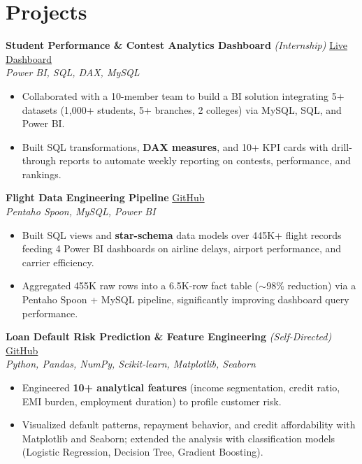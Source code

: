 \documentclass[a4paper,10pt]{article}
\begin{document}
\section{Projects}
\textbf{Student Performance \& Contest Analytics Dashboard} \textit{(Internship)} \hfill \href{https://app.powerbi.com/links/q7Z6OSaJ-t?ctid=0d11b6ec-52ac-4a84-9442-43048f433ac9&pbi_source=linkShare}{Live Dashboard} \\
\textit{Power BI, SQL, DAX, MySQL}
\begin{itemize}[nosep,after=\strut, leftmargin=1em, itemsep=1pt,label=--]
\item Collaborated with a 10-member team to build a BI solution integrating 5+ datasets (1,000+ students, 5+ branches, 2 colleges) via MySQL, SQL, and Power BI.
\item Built SQL transformations, \textbf{DAX measures}, and 10+ KPI cards with drill-through reports to automate weekly reporting on contests, performance, and rankings.
\end{itemize}
\vspace{2pt}
\textbf{Flight Data Engineering Pipeline} \hfill \href{https://github.com/Rider-04/flight-data-engineering-pipeline.git}{GitHub} \\
\textit{Pentaho Spoon, MySQL, Power BI}
\begin{itemize}[nosep,after=\strut, leftmargin=1em, itemsep=1pt,label=--]
\item Built SQL views and \textbf{star-schema} data models over 445K+ flight records feeding 4 Power BI dashboards on airline delays, airport performance, and carrier efficiency.
\item Aggregated 455K raw rows into a 6.5K-row fact table ($\sim$98\% reduction) via a Pentaho Spoon + MySQL pipeline, significantly improving dashboard query performance.
\end{itemize}
\vspace{2pt}
\textbf{Loan Default Risk Prediction \& Feature Engineering} \textit{(Self-Directed)} \hfill \href{https://github.com/Rider-04/bank-loan-default-risk-analysis}{GitHub} \\
\textit{Python, Pandas, NumPy, Scikit-learn, Matplotlib, Seaborn}
\begin{itemize}[nosep,after=\strut, leftmargin=1em, itemsep=1pt,label=--]
\item Engineered \textbf{10+ analytical features} (income segmentation, credit ratio, EMI burden, employment duration) to profile customer risk.
\item Visualized default patterns, repayment behavior, and credit affordability with Matplotlib and Seaborn; extended the analysis with classification models (Logistic Regression, Decision Tree, Gradient Boosting).
\end{itemize}
\vspace{2pt}
\end{document}
